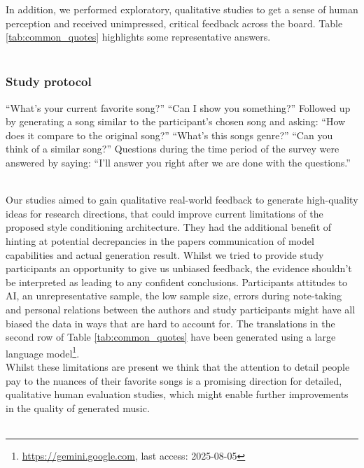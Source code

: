 \documentclass[a4paper,12pt,twoside]{article}
\begin{document}
In addition, we performed exploratory, qualitative studies to get a sense of human perception and received unimpressed, critical feedback across the board. Table \ref{tab:common_quotes} highlights some representative answers.\\ \


\subsubsection*{Study protocol}
\begin{outline}
    \1 ``What's your current favorite song?''
    \1 ``Can I show you something?''
    \0 Followed up by generating a song similar to the participant's chosen song and asking:
    \1 ``How does it compare to the original song?''
    \1 ``What's this songs genre?''
    \1 ``Can you think of a similar song?''
    \0 Questions during the time period of the survey were answered by saying:
    \1 ``I'll answer you right after we are done with the questions.'' \\ \
\end{outline}

Our studies aimed to gain qualitative real-world feedback to generate high-quality ideas for research directions, that could improve current limitations of the proposed style conditioning architecture. They had the additional benefit of hinting at potential decrepancies in the papers communication of model capabilities and actual generation result. Whilst we tried to provide study participants an opportunity to give us unbiased feedback, the evidence shouldn't be interpreted as leading to any confident conclusions. Participants attitudes to AI, an unrepresentative sample, the low sample size, errors during note-taking and personal relations between the authors and study participants might have all biased the data in ways that are hard to account for. The translations in the second row of Table \ref{tab:common_quotes} have been generated using a large language model\footnote{\url{https://gemini.google.com}, last access: 2025-08-05}.\\

Whilst these limitations are present we think that the attention to detail people pay to the nuances of their favorite songs is a promising direction for detailed, qualitative human evaluation studies, which might enable further improvements in the quality of generated music.\\ \
\end{document}
